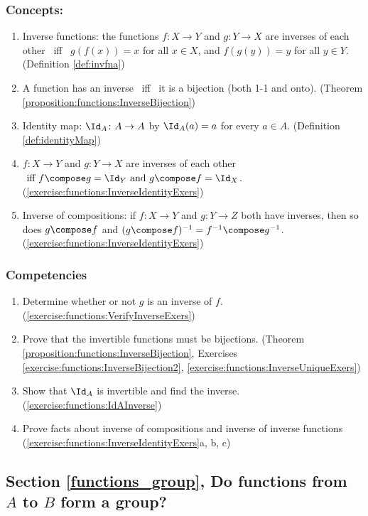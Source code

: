 \subsubsection*{Concepts:}
\begin{enumerate}
\item 
Inverse functions: the functions $f \colon X \to Y$  and $g \colon Y \to X$ are inverses of each other \mbox{ iff } $g(f(x)) = x$ for all $x \in X$, and $f(g(y)) = y$ for all $y \in Y$. (Definition \ref{def:invfna})
\item
A function has an inverse \mbox{ iff } it is a bijection (both 1-1 and onto). (Theorem \ref{proposition:functions:InverseBijection})
\item
Identity map: $\Id_{A} \colon A \to A$ by $\Id_{A}(a) = a$ for every $a \in A$. (Definition \ref{def:identityMap})
\item
$f \colon X \to Y$ and $g \colon Y \to X$ are inverses of each other  $\mbox{ iff } f \compose g = \Id_{Y} \text{  and  }g \compose f = \Id_{X}$. (\ref{exercise:functions:InverseIdentityExers})
\item
Inverse of compositions: if $f \colon X \to Y$ and $g \colon Y \to Z$ both have inverses, then so does $g \compose f$  and 
$(g \compose f)^{-1} = f^{-1} \compose g^{-1}$. (\ref{exercise:functions:InverseIdentityExers})
\end{enumerate}

\subsubsection*{Competencies}
\begin{enumerate}
\item
Determine whether or not $g$ is an inverse of $f$. (\ref{exercise:functions:VerifyInverseExers})
\item
Prove that the invertible functions must be bijections. (Theorem \ref{proposition:functions:InverseBijection}, Exercises \ref{exercise:functions:InverseBijection2}, \ref{exercise:functions:InverseUniqueExers})
\item
Show that $\Id_{A}$ is invertible and find the inverse. (\ref{exercise:functions:IdAInverse})
\item
Prove facts about inverse of compositions and inverse of inverse functions (\ref{exercise:functions:InverseIdentityExers}a, b, c)
\end{enumerate}


\subsection*{Section \ref{functions_group}, Do functions from $A$ to $B$ form a group?}
